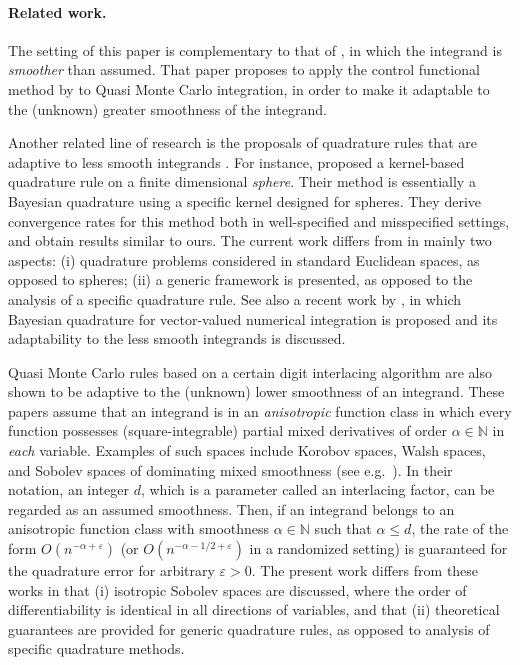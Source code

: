 \documentclass[11pt]{article}
\theoremstyle{remark}
\theoremstyle{example}
\theoremstyle{remark}
\newcommand{\N}{\mathbb{N}}
\newcommand{\ve}{\varepsilon}
\newcommand{\citep}{\cite}
\newcommand{\citealp}{\cite}
\begin{document}
\paragraph{Related work.}
The setting of this paper is complementary to that of \cite{OatGir16}, in which the integrand is {\em smoother} than assumed. 
That paper proposes to apply the control functional method by \cite{OatGirCho17} to Quasi Monte Carlo integration, in order to make it adaptable to the (unknown) greater smoothness of the integrand.

Another related line of research is the proposals of quadrature rules that are adaptive to less smooth integrands \citep{Dic07,Dic08,Dic11,FusHanNarWarWri14,GodDic15}.
For instance, \cite{FusHanNarWarWri14} proposed a kernel-based quadrature rule on a finite dimensional {\em sphere}.
Their method is essentially a Bayesian quadrature using a specific kernel designed for spheres. 
They derive convergence rates for this method both in well-specified and misspecified settings, and obtain results similar to ours. The current work differs from \cite{FusHanNarWarWri14} in mainly two aspects: 
(i) quadrature problems considered in standard Euclidean spaces, as opposed to spheres;
(ii) a generic framework is presented, as opposed to the analysis of a specific quadrature rule.
See also a recent work by \cite{Xi_ICML2018}, in which Bayesian quadrature for vector-valued numerical integration is proposed and its adaptability to the less smooth integrands is discussed.

Quasi Monte Carlo rules based on a certain digit interlacing algorithm \citep{Dic07,Dic08,Dic11,GodDic15} are also shown to be adaptive to the (unknown) lower smoothness of an integrand.
These papers assume that an integrand is in an {\em anisotropic} function class in which every function possesses (square-integrable) partial mixed derivatives of order $\alpha \in \N$ in {\em each} variable. 
Examples of such spaces include Korobov spaces, Walsh spaces, and Sobolev spaces of dominating mixed smoothness (see e.g.~\citealp{NovWoz10,DicKuoSlo13}).
In their notation, an integer $d$, which is a parameter called an interlacing factor, can be regarded as an assumed smoothness. 
Then, if an integrand belongs to an anisotropic function class with smoothness $\alpha \in \N$ such that $\alpha \leq d$, the rate of the form $O(n^{-\alpha + \ve})$ (or $O(n^{-\alpha -1/2 + \ve})$ in a randomized setting) is guaranteed for the quadrature error for arbitrary $\ve > 0$.
The present work differs from these works in that (i) isotropic Sobolev spaces are discussed, where the order of differentiability is identical in all directions of variables, and that (ii) theoretical guarantees are provided for generic quadrature rules, as opposed to analysis of specific quadrature methods.
\end{document}
